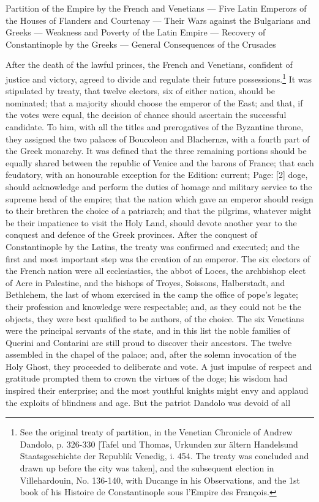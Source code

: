 

Partition of the Empire by the French and Venetians \texthebrew{—} Five Latin Emperors of the Houses of Flanders and Courtenay \texthebrew{—} Their Wars against the Bulgarians and Greeks \texthebrew{—} Weakness and Poverty of the Latin Empire \texthebrew{—} Recovery of Constantinople by the Greeks \texthebrew{—} General Consequences of the Crusades

After the death of the lawful princes, the French and Venetians, confident of justice and victory, agreed to divide and regulate their future possessions.\footnote{See the original treaty of partition, in the Venetian Chronicle of Andrew Dandolo, p. 326-330 [Tafel und Thomas, Urkunden zur ältern Handelsund Staatsgeschichte der Republik Venedig, i. 454. The treaty was concluded and drawn up before the city was taken], and the subsequent election in Villehardouin, No. 136-140, with Ducange in his Observations, and the 1st book of his Histoire de Constantinople sous l\texthebrew{}’Empire des François.} It was stipulated by treaty, that twelve electors, six of either nation, should be nominated; that a majority should choose the emperor of the East; and that, if the votes were equal, the decision of chance should ascertain the successful candidate. To him, with all the titles and prerogatives of the Byzantine throne, they assigned the two palaces of Boucoleon and Blachernæ, with a fourth part of the Greek monarchy. It was defined that the three remaining portions should be equally shared between the republic of Venice and the barons of France; that each feudatory, with an honourable exception for the Edition: current; Page: [2] doge, should acknowledge and perform the duties of homage and military service to the supreme head of the empire; that the nation which gave an emperor should resign to their brethren the choice of a patriarch; and that the pilgrims, whatever might be their impatience to visit the Holy Land, should devote another year to the conquest and defence of the Greek provinces. After the conquest of Constantinople by the Latins, the treaty was confirmed and executed; and the first and most important step was the creation of an emperor. The six electors of the French nation were all ecclesiastics, the abbot of Loces, the archbishop elect of Acre in Palestine, and the bishops of Troyes, Soissons, Halberstadt, and Bethlehem, the last of whom exercised in the camp the office of pope\texthebrew{}’s legate; their profession and knowledge were respectable; and, as they could not be the objects, they were best qualified to be authors, of the choice. The six Venetians were the principal servants of the state, and in this list the noble families of Querini and Contarini are still proud to discover their ancestors. The twelve assembled in the chapel of the palace; and, after the solemn invocation of the Holy Ghost, they proceeded to deliberate and vote. A just impulse of respect and gratitude prompted them to crown the virtues of the doge; his wisdom had inspired their enterprise; and the most youthful knights might envy and applaud the exploits of blindness and age. But the patriot Dandolo was devoid of all 